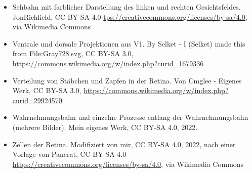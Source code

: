 \documentclass{beamer}
\begin{document}
\begin{frame}
\begin{tiny}
\begin{itemize}
\item
Sehbahn mit farblicher Darstellung des linken und rechten Gesichtsfeldes. JonRichfield, CC BY-SA 4.0 \url{tps://creativecommons.org/licenses/by-sa/4.0}, via Wikimedia Commons

\item
Ventrale und dorsale Projektionen aus V1. By Selket - I (Selket) made this from File:Gray728.svg, CC BY-SA 3.0, \url{https://commons.wikimedia.org/w/index.php?curid=1679336}

\item
Verteilung von Stäbchen und Zapfen in der Retina. Von Cmglee - Eigenes Werk, CC BY-SA 3.0, \url{https://commons.wikimedia.org/w/index.php?curid=29924570}

\item
Wahrnehmungsbahn und einzelne Prozesse entlang der Wahrnehmungsbahn (mehrere Bilder). Mein eigenes Werk, CC BY-SA 4.0, 2022. 

\item
Zellen der Retina. Modifiziert von mir, CC BY-SA 4.0, 2022, nach einer Vorlage von  Pancrat, CC BY-SA 4.0 \url{https://creativecommons.org/licenses/by-sa/4.0}, via Wikimedia Commons

\end{itemize}
\end{tiny}
\end{frame}
\end{document}
